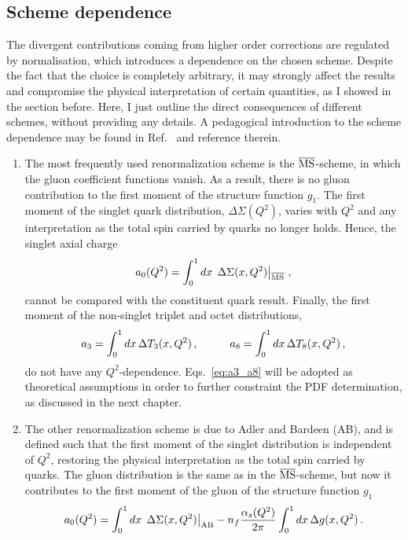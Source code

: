 \subsection{Scheme dependence}
The divergent contributions coming from higher order corrections are regulated by normalisation, which introduces a dependence on the chosen scheme. Despite the fact that the choice is completely arbitrary, it may strongly affect the results and compromise the physical interpretation of certain quantities, as I showed in the section before. Here, I just outline the direct consequences of different schemes, without providing any details. A pedagogical introduction to the scheme dependence may be found in Ref.~\cite{leader_2001} and reference therein. 
\begin{enumerate}
  \item The most frequently used renormalization scheme is the $\overline{\textrm{MS}}$-scheme, in which the gluon coefficient functions vanish. As a result, there is no gluon contribution to the first moment of the structure function $g_1$. The first moment of the singlet quark distribution, $\Delta \Sigma (Q^2)$, varies with $Q^2$ and any interpretation as the total spin carried by quarks no longer holds. Hence, the singlet axial charge 
  \begin{equation}
    a_0 (Q^2) = \int_{0}^{1} dx \,  \left.\Delta \Sigma(x,Q^2) \right|_{\overline{\textrm{MS}}} \,,
    \label{eq:MSB_scheme}
  \end{equation}
  cannot be compared with the constituent quark result. Finally, the first moment of the non-singlet triplet and octet distributions,
  \begin{equation}
    a_3 = \int_{0}^{1} dx \, \Delta T_3 (x,Q^2) \,, \hspace{10mm} a_8 = \int_{0}^{1} dx \, \Delta T_8 (x,Q^2) \,,
    \label{eq:a3_a8}
  \end{equation}
  do not have any $Q^2$-dependence. Eqs.~\eqref{eq:a3_a8} will be adopted as theoretical assumptions in order to further constraint the PDF determination, as discussed in the next chapter.
  
  \item The other renormalization scheme is due to Adler and Bardeen (AB), and is defined such that the first moment of the singlet distribution is independent of $Q^2$, restoring the physical interpretation as the total spin carried by quarks. The gluon distribution is the same as in the $\overline{\textrm{MS}}$-scheme, but now it contributes to the first moment of the gluon of the structure function $g_1$
  \begin{equation}
    a_{0}(Q^2) = \int_{0}^{1} dx \, \left. \Delta \Sigma (x,Q^2) \right|_{\textrm{AB}} - n_f \frac{\alpha_s(Q^2)}{2\pi} \int_{0}^{1} dx \, \Delta g(x,Q^2) \,.
    \label{eq:AB_scheme}
  \end{equation}
\end{enumerate}
